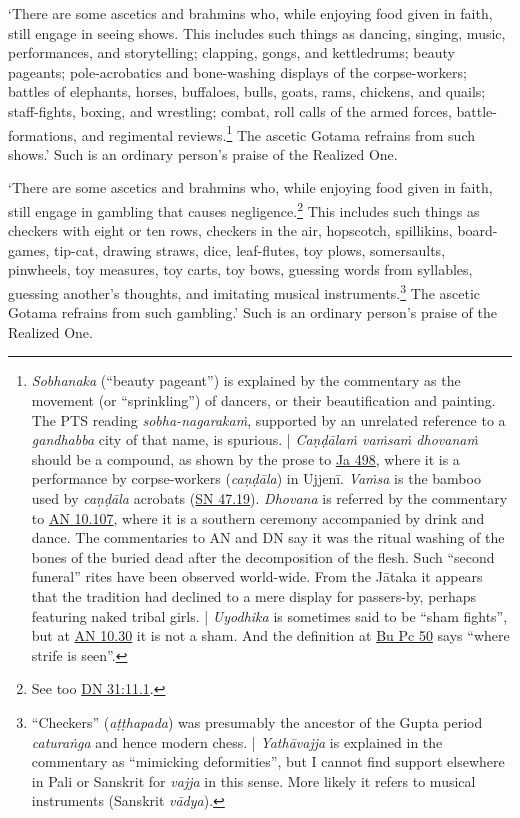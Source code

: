 \documentclass[12pt,openany]{book}%
\begin{document}
‘There are some ascetics and brahmins who, while enjoying food given in faith, still engage in seeing shows. This includes such things as dancing, singing, music, performances, and storytelling; clapping, gongs, and kettledrums; beauty pageants; pole-acrobatics and bone-washing displays of the corpse-workers; battles of elephants, horses, buffaloes, bulls, goats, rams, chickens, and quails; staff-fights, boxing, and wrestling; combat, roll calls of the armed forces, battle-formations, and regimental reviews.\footnote{\textit{Sobhanaka} (“beauty pageant”) is explained by the commentary as the movement (or “sprinkling”) of dancers, or their beautification and painting. The PTS reading \textit{sobha-\textsanskrit{nagarakaṁ}}, supported by an unrelated reference to a \textit{gandhabba} city of that name, is spurious. | \textit{\textsanskrit{Caṇḍālaṁ} \textsanskrit{vaṁsaṁ} \textsanskrit{dhovanaṁ}} should be a compound, as shown by the prose to \href{https://suttacentral.net/ja498/en/sujato}{Ja 498}, where it is a performance by corpse-workers (\textit{\textsanskrit{caṇḍāla}}) in \textsanskrit{Ujjenī}. \textit{\textsanskrit{Vaṁsa}} is the bamboo used by \textit{\textsanskrit{caṇḍāla}} acrobats (\href{https://suttacentral.net/sn47.19/en/sujato}{SN 47.19}). \textit{Dhovana} is referred by the commentary to \href{https://suttacentral.net/an10.107/en/sujato}{AN 10.107}, where it is a southern ceremony accompanied by drink and dance. The commentaries to AN and DN say it was the ritual washing of the bones of the buried dead after the decomposition of the flesh. Such “second funeral” rites have been observed world-wide. From the \textsanskrit{Jātaka} it appears that the tradition had declined to a mere display for passers-by, perhaps featuring naked tribal girls. | \textit{Uyodhika} is sometimes said to be “sham fights”, but at \href{https://suttacentral.net/an10.30/en/sujato}{AN 10.30} it is not a sham. And the definition at \href{https://suttacentral.net/pli-tv-bu-vb-pc50/en/sujato}{Bu Pc 50} says “where strife is seen”. } The ascetic Gotama refrains from such shows.’ Such is an ordinary person’s praise of the Realized One. 

‘There are some ascetics and brahmins who, while enjoying food given in faith, still engage in gambling that causes negligence.\footnote{See too \href{https://suttacentral.net/dn31/en/sujato\#11.1}{DN 31:11.1}. } This includes such things as checkers with eight or ten rows, checkers in the air, hopscotch, spillikins, board-games, tip-cat, drawing straws, dice, leaf-flutes, toy plows, somersaults, pinwheels, toy measures, toy carts, toy bows, guessing words from syllables, guessing another’s thoughts, and imitating musical instruments.\footnote{“Checkers” (\textit{\textsanskrit{aṭṭhapada}}) was presumably the ancestor of the Gupta period \textit{\textsanskrit{caturaṅga}} and hence modern chess. | \textit{\textsanskrit{Yathāvajja}} is explained in the commentary as “mimicking deformities”, but I cannot find support elsewhere in Pali or Sanskrit for \textit{vajja} in this sense. More likely it refers to musical instruments (Sanskrit \textit{\textsanskrit{vādya}}). } The ascetic Gotama refrains from such gambling.’ Such is an ordinary person’s praise of the Realized One. 
\end{document}
